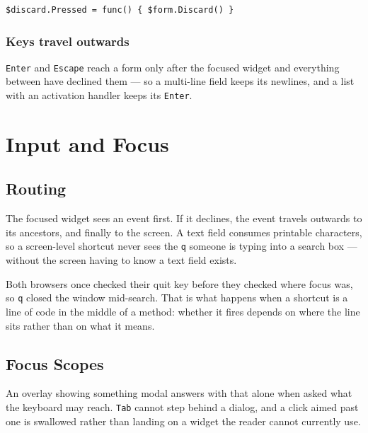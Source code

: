 \documentclass[11pt,a4paper,twoside,openany]{book}
\newcommand{\code}[1]{\texttt{\small #1}}
\begin{document}
\begin{lstlisting}
$discard.Pressed = func() { $form.Discard() }
\end{lstlisting}

\subsection{Keys travel outwards}

\code{Enter} and \code{Escape} reach a form only after the focused widget and
everything between have declined them --- so a multi-line field keeps its
newlines, and a list with an activation handler keeps its \code{Enter}.

\chapter{Input and Focus}

\section{Routing}

The focused widget sees an event first. If it declines, the event travels outwards
to its ancestors, and finally to the screen. A text field consumes printable
characters, so a screen-level shortcut never sees the \code{q} someone is typing
into a search box --- without the screen having to know a text field exists.

\begin{aside}
Both browsers once checked their quit key before they checked where focus was, so
\code{q} closed the window mid-search. That is what happens when a shortcut is a
line of code in the middle of a method: whether it fires depends on where the line
sits rather than on what it means.
\end{aside}

\section{Focus Scopes}

An overlay showing something modal answers with that alone when asked what the
keyboard may reach. \code{Tab} cannot step behind a dialog, and a click aimed past
one is swallowed rather than landing on a widget the reader cannot currently use.
\end{document}
